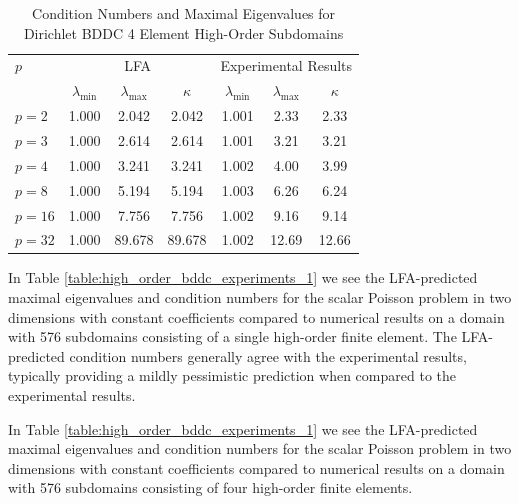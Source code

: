 \begin{table}[ht!]
\begin{center}
\begin{tabular}{l ccc ccc}
  \toprule
  $p$  &  \multicolumn{3}{c}{LFA}  &  \multicolumn{3}{c}{Experimental Results}  \\
                      &  $\lambda_{\text{min}}$  &  $\lambda_{\text{max}}$  &  $\kappa$ & $\lambda_{\text{min}}$  &  $\lambda_{\text{max}}$ & $\kappa$  \\
  \toprule
  $p = 2$   &  1.000  &   2.042  &   2.042  &  1.001  &   2.33  &   2.33  \\
  $p = 3$   &  1.000  &   2.614  &   2.614  &  1.001  &   3.21  &   3.21  \\
  $p = 4$   &  1.000  &   3.241  &   3.241  &  1.002  &   4.00  &   3.99  \\
  $p = 8$   &  1.000  &   5.194  &   5.194  &  1.003  &   6.26  &   6.24  \\
  $p = 16$  &  1.000  &   7.756  &   7.756  &  1.002  &   9.16  &   9.14  \\
  $p = 32$  &  1.000  &  89.678  &  89.678  &  1.002  &  12.69  &  12.66  \\
  \bottomrule
\end{tabular}
\end{center}
\caption{Condition Numbers and Maximal Eigenvalues for Dirichlet BDDC 4 Element High-Order Subdomains}
\label{table:high_order_bddc_experiments_2}
\end{table}

In Table \ref{table:high_order_bddc_experiments_1} we see the LFA-predicted maximal eigenvalues and condition numbers for the scalar Poisson problem in two dimensions with constant coefficients compared to numerical results on a domain with 576 subdomains consisting of a single high-order finite element.
The LFA-predicted condition numbers generally agree with the experimental results, typically providing a mildly pessimistic prediction when compared to the experimental results.

In Table \ref{table:high_order_bddc_experiments_1} we see the LFA-predicted maximal eigenvalues and condition numbers for the scalar Poisson problem in two dimensions with constant coefficients compared to numerical results on a domain with 576 subdomains consisting of four high-order finite elements.
